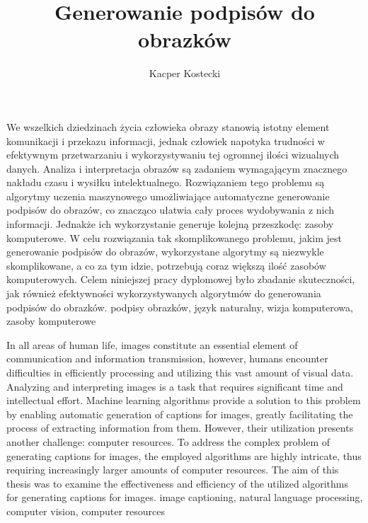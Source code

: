 \documentclass[
    left=2.5cm,         %
    right=2.5cm,        %
    top=2.5cm,          %
    bottom=3cm,         %
    bindingoffset=6mm,  %
    nohyphenation=false %
]{src/wut-thesis}
\begin{document}
\MasterThesis %
\facultyeiti
{}
\title{Generowanie podpisów do obrazków}
\author{Kacper Kostecki}
\date{\the\year}
\maketitle

\cleardoublepage %
\abstract We wszelkich dziedzinach życia człowieka obrazy stanowią istotny element komunikacji i przekazu informacji, jednak człowiek napotyka trudności w efektywnym przetwarzaniu i wykorzystywaniu tej ogromnej ilości wizualnych danych. Analiza i interpretacja obrazów są zadaniem wymagającym znacznego nakładu czasu i wysiłku intelektualnego. Rozwiązaniem tego problemu są algorytmy uczenia maszynowego umożliwiające automatyczne generowanie podpisów do obrazów, co znacząco ułatwia cały proces wydobywania z nich informacji. Jednakże ich wykorzystanie generuje kolejną przeszkodę: zasoby komputerowe. W celu rozwiązania tak skomplikowanego problemu, jakim jest generowanie podpisów do obrazów, wykorzystane algorytmy są niezwykle skomplikowane, a co za tym idzie, potrzebują coraz większą ilość zasobów komputerowych. Celem niniejszej pracy dyplomowej było zbadanie skuteczności, jak również efektywności wykorzystywanych algorytmów do generowania podpisów do obrazków.
\keywords podpisy obrazków, język naturalny, wizja komputerowa, zasoby komputerowe

\vspace{1cm}
\secondabstract In all areas of human life, images constitute an essential element of communication and information transmission, however, humans encounter difficulties in efficiently processing and utilizing this vast amount of visual data. Analyzing and interpreting images is a task that requires significant time and intellectual effort. Machine learning algorithms provide a solution to this problem by enabling automatic generation of captions for images, greatly facilitating the process of extracting information from them. However, their utilization presents another challenge: computer resources. To address the complex problem of generating captions for images, the employed algorithms are highly intricate, thus requiring increasingly larger amounts of computer resources. The aim of this thesis was to examine the effectiveness and efficiency of the utilized algorithms for generating captions for images.
\secondkeywords image captioning, natural language processing, computer vision, computer resources
\end{document}

